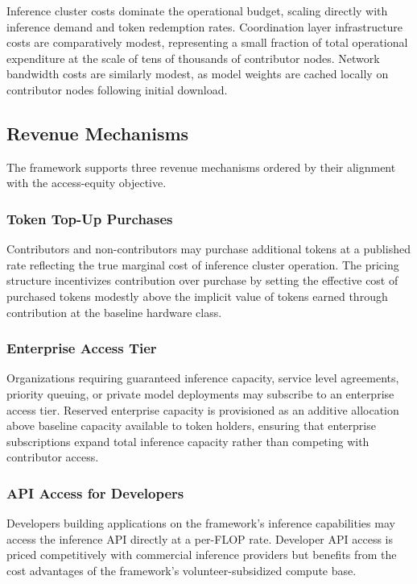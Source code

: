 \documentclass[12pt]{article}
\begin{document}
Inference cluster costs dominate the operational budget, scaling directly with inference demand and token redemption rates. Coordination layer infrastructure costs are comparatively modest, representing a small fraction of total operational expenditure at the scale of tens of thousands of contributor nodes. Network bandwidth costs are similarly modest, as model weights are cached locally on contributor nodes following initial download.

\subsection{Revenue Mechanisms}

The framework supports three revenue mechanisms ordered by their alignment with the access-equity objective.

\subsubsection{Token Top-Up Purchases}

Contributors and non-contributors may purchase additional tokens at a published rate reflecting the true marginal cost of inference cluster operation. The pricing structure incentivizes contribution over purchase by setting the effective cost of purchased tokens modestly above the implicit value of tokens earned through contribution at the baseline hardware class.

\subsubsection{Enterprise Access Tier}

Organizations requiring guaranteed inference capacity, service level agreements, priority queuing, or private model deployments may subscribe to an enterprise access tier. Reserved enterprise capacity is provisioned as an additive allocation above baseline capacity available to token holders, ensuring that enterprise subscriptions expand total inference capacity rather than competing with contributor access.

\subsubsection{API Access for Developers}

Developers building applications on the framework's inference capabilities may access the inference API directly at a per-FLOP rate. Developer API access is priced competitively with commercial inference providers but benefits from the cost advantages of the framework's volunteer-subsidized compute base.
\end{document}
